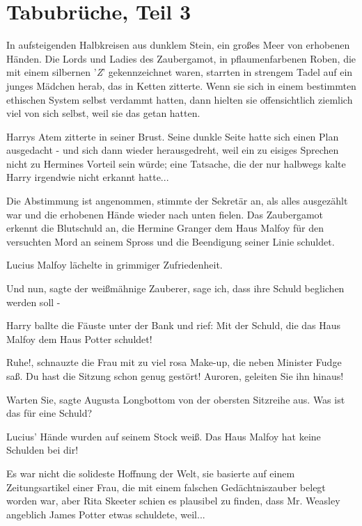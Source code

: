 \chapter{Tabubrüche, Teil 3}

In aufsteigenden Halbkreisen aus dunklem Stein, ein großes Meer von erhobenen
Händen. Die Lords und Ladies des Zaubergamot, in pflaumenfarbenen Roben, die mit
einem silbernen '\emph{Z}' gekennzeichnet waren, starrten in strengem Tadel auf
ein junges Mädchen herab, das in Ketten zitterte. Wenn sie sich in einem
bestimmten ethischen System selbst verdammt hatten, dann hielten sie
offensichtlich ziemlich viel von sich selbst, weil sie das getan hatten.

Harrys Atem zitterte in seiner Brust. Seine dunkle Seite hatte sich einen Plan
ausgedacht - und sich dann wieder herausgedreht, weil ein zu eisiges Sprechen
nicht zu Hermines Vorteil sein würde; eine Tatsache, die der nur halbwegs kalte
Harry irgendwie nicht erkannt hatte...

\glqq Die Abstimmung ist angenommen\grqq{}, stimmte der Sekretär an, als alles
ausgezählt war und die erhobenen Hände wieder nach unten fielen. \glqq Das
Zaubergamot erkennt die Blutschuld an, die Hermine Granger dem Haus Malfoy für
den versuchten Mord an seinem Spross und die Beendigung seiner Linie
schuldet.\grqq{}

Lucius Malfoy lächelte in grimmiger Zufriedenheit.

\glqq Und nun\grqq{}, sagte der weißmähnige Zauberer, \glqq sage ich, dass ihre
Schuld beglichen werden soll -\grqq{}

Harry ballte die Fäuste unter der Bank und rief: \glqq Mit der Schuld, die das
Haus Malfoy dem Haus Potter schuldet!\grqq{}

\glqq Ruhe!\grqq{}, schnauzte die Frau mit zu viel rosa Make-up, die neben
Minister Fudge saß. \glqq Du hast die Sitzung schon genug gestört! Auroren,
geleiten Sie ihn hinaus!\grqq{}

\glqq Warten Sie\grqq{}, sagte Augusta Longbottom von der obersten Sitzreihe
aus. \glqq Was ist das für eine Schuld?\grqq{}

Lucius' Hände wurden auf seinem Stock weiß. \glqq Das Haus Malfoy hat keine
Schulden bei dir!\grqq{}

Es war nicht die solideste Hoffnung der Welt, sie basierte auf einem
Zeitungsartikel einer Frau, die mit einem falschen Gedächtniszauber belegt
worden war, aber Rita Skeeter schien es plausibel zu finden, dass Mr. Weasley
angeblich James Potter etwas schuldete, weil...


